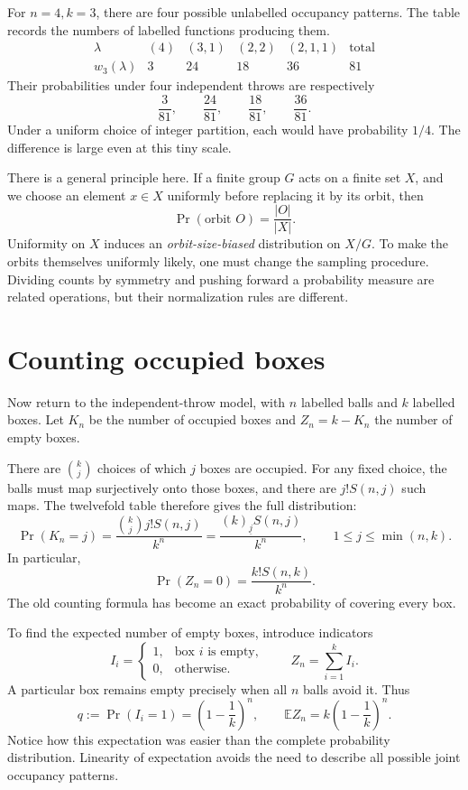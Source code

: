 \begin{example}
For \(n=4,k=3\), there are four possible unlabelled occupancy patterns. The table records the numbers of labelled functions producing them.
\[
\begin{array}{c|rrrr|r}
 \lambda & (4)&(3,1)&(2,2)&(2,1,1)&\text{total}\\ \hline
 w_3(\lambda)&3&24&18&36&81
\end{array}
\]
Their probabilities under four independent throws are respectively
\[
 \frac3{81},\qquad\frac{24}{81},\qquad
 \frac{18}{81},\qquad\frac{36}{81}.
\]
Under a uniform choice of integer partition, each would have probability \(1/4\). The difference is large even at this tiny scale.
\end{example}

There is a general principle here. If a finite group \(G\) acts on a finite set \(X\), and we choose an element \(x\in X\) uniformly before replacing it by its orbit, then
\[
 \Pr(\text{orbit }O)=\frac{|O|}{|X|}.
\]
Uniformity on \(X\) induces an \emph{orbit-size-biased} distribution on \(X/G\). To make the orbits themselves uniformly likely, one must change the sampling procedure. Dividing counts by symmetry and pushing forward a probability measure are related operations, but their normalization rules are different.

\section{Counting occupied boxes}

Now return to the independent-throw model, with \(n\) labelled balls and \(k\) labelled boxes. Let \(K_n\) be the number of occupied boxes and \(Z_n=k-K_n\) the number of empty boxes.

There are \(\binom kj\) choices of which \(j\) boxes are occupied. For any fixed choice, the balls must map surjectively onto those boxes, and there are \(j!S(n,j)\) such maps. The twelvefold table therefore gives the full distribution:
\[
 \boxed{\Pr(K_n=j)=
 \frac{\binom kj j!S(n,j)}{k^n}
 =\frac{(k)_{\underline j}S(n,j)}{k^n},}
 \qquad 1\le j\le\min(n,k).
\]
In particular,
\[
 \Pr(Z_n=0)=\frac{k!S(n,k)}{k^n}.
\]
The old counting formula has become an exact probability of covering every box.

To find the expected number of empty boxes, introduce indicators
\[
 I_i=\begin{cases}
 1,&\text{box }i\text{ is empty},\\
 0,&\text{otherwise}.
 \end{cases}
 \qquad Z_n=\sum_{i=1}^kI_i.
\]
A particular box remains empty precisely when all \(n\) balls avoid it. Thus
\[
 q:=\Pr(I_i=1)=\left(1-\frac1k\right)^n,
 \qquad
 \boxed{\mathbb E Z_n=k\left(1-\frac1k\right)^n.}
\]
Notice how this expectation was easier than the complete probability distribution. Linearity of expectation avoids the need to describe all possible joint occupancy patterns.

